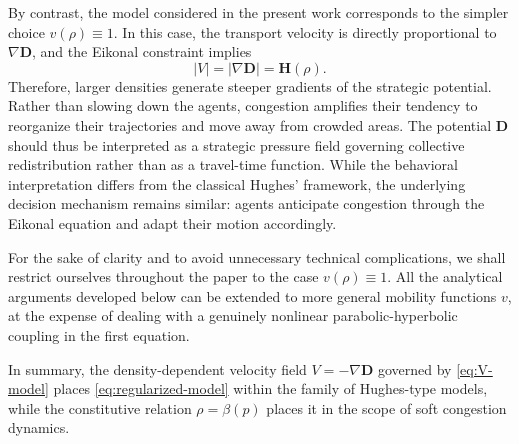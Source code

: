 \documentclass[final,reqno]{amsart}
\theoremstyle{plain}
\theoremstyle{definition}
\theoremstyle{remark}
\numberwithin{remark}{section}	%
\numberwithin{example}{section}	%
\newcommand{\de}{\mathbf{D}}
\newcommand{\he}{\mathbf{H}}
\begin{document}
By contrast, the model considered in the present work corresponds to the simpler choice $v(\rho)\equiv 1$. In this case, the transport velocity is directly proportional to $\nabla\de$, and the Eikonal constraint implies
\[
|V|=|\nabla\de|=\he(\rho).
\]
Therefore, larger densities generate steeper gradients of the strategic potential. Rather than slowing down the agents, congestion amplifies their tendency to reorganize their trajectories and move away from crowded areas. The potential $\de$ should thus be interpreted as a strategic pressure field governing collective redistribution rather than as a travel-time function. While the behavioral interpretation differs from the classical Hughes' framework, the underlying decision mechanism remains similar: agents anticipate congestion through the Eikonal equation and adapt their motion accordingly.

For the sake of clarity and to avoid unnecessary technical complications, we shall restrict ourselves throughout the paper to the case $v(\rho)\equiv 1$. All the analytical arguments developed below can be extended to more general mobility functions $v$, at the expense of dealing with a genuinely nonlinear parabolic-hyperbolic coupling in the first equation.
 




In summary, the density-dependent velocity field $V=-\nabla\de$ governed by \eqref{eq:V-model} places \eqref{eq:regularized-model} within the family of Hughes-type models, while the constitutive relation $\rho = \beta(p)$ places it in the scope of soft congestion dynamics.

 
  
\end{document}
